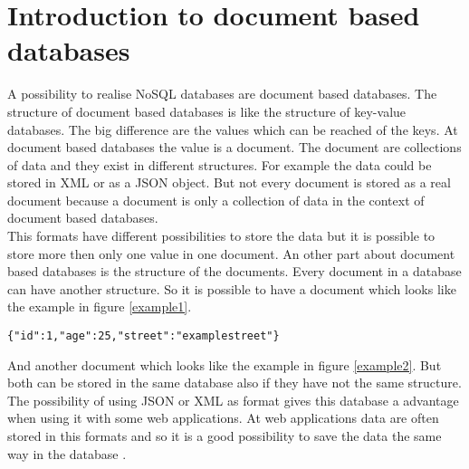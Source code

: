 \section{Introduction to document based databases}
A possibility to realise NoSQL databases are document based databases. The structure of document based databases is like the structure of key-value databases. The big difference are the values which can be reached of the keys. At document based databases the value is a document. The document are collections of data and they exist in different structures. For example the data could be stored in XML or as a JSON object. But not every document is stored as a real document because a document is only a collection of data in the context of document based databases. \\
This formats have different possibilities to store the data but it is possible to store more then only one value in one document. An other part about document based databases is the structure of the documents. Every document in a database can have another structure. 
So it is possible to have a document which looks like the example in figure \ref{example1}.

\begin{lstlisting}[frame=single, caption=Example]
%\begin{mylisting}{\label{example1} Example of an document}
{"id":1,"age":25,"street":"examplestreet"}
\end{lstlisting}
And another document which looks like the example in figure \ref{example2}. 
%
But both can be stored in the same database also if they have not the same structure. 
The possibility of using JSON or XML as format gives this database a advantage when using it with some web applications. At web applications data are often stored in this formats and so it is a good possibility to save the data the same way in the database \cite{DocDBIntro1,DocDBIntro2,DocDBIntro3}.
